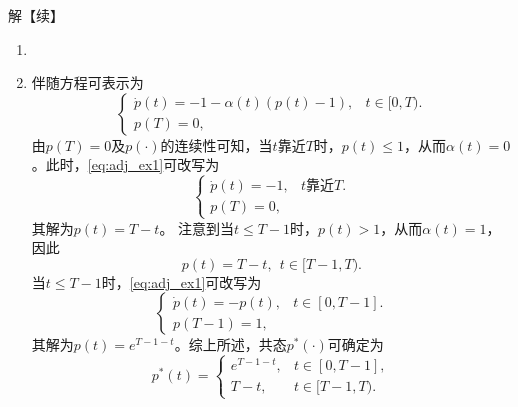 \begin{frame}{\subsecname}
\small 
\begin{block}{解【续】}
\begin{enumerate}[2]
\item {}
\item[] 伴随方程可表示为
\begin{equation}\label{eq:adj_ex1}
    \left\{
    \begin{array}{ll}
        \dot p(t) = -1-\alpha(t)(p(t)-1),  &  t \in [0,T).  \\[0.05in]
        p(T) = 0, & 
    \end{array}
    \right.
\end{equation} \pause 
由$p(T)=0$及$p(\cdot)$的连续性可知，当$t$靠近$T$时，$p(t) \le 1$，从而$\alpha(t)=0$。此时，\eqref{eq:adj_ex1}可改写为
\begin{equation}\label{eq:adj1_ex1}
    \left\{
    \begin{array}{ll}
        \dot p(t) = -1,  &  t \text{靠近} T.  \\[0.05in]
        p(T) = 0, & 
    \end{array}
    \right.
\end{equation}
其解为$p(t)=T-t$。\pause 
注意到当$t\le T-1$时，$p(t) > 1$，从而$\alpha(t) = 1$，因此
$$
p(t) = T-t, ~~ t \in[T-1, T). 
$$
\pause 
当$t\le T-1$时，\eqref{eq:adj_ex1}可改写为
\begin{equation}\label{eq:adj2_ex1}
    \left\{
    \begin{array}{ll}
        \dot p(t) = - p(t),  &  t \in[0, T-1].  \\[0.05in]
        p(T-1) = 1, & 
    \end{array}
    \right.
\end{equation}
其解为$p(t) = e^{T-1-t}$。综上所述，共态$p^*(\cdot)$可确定为
$$
p^*(t) = \left\{
\begin{array}{ll}
e^{T-1-t}, & t \in[0, T-1], \\[0.05in]
T-t, & t \in[T-1, T). 
\end{array}
\right.
$$
\end{enumerate}
\end{block}
\end{frame}

